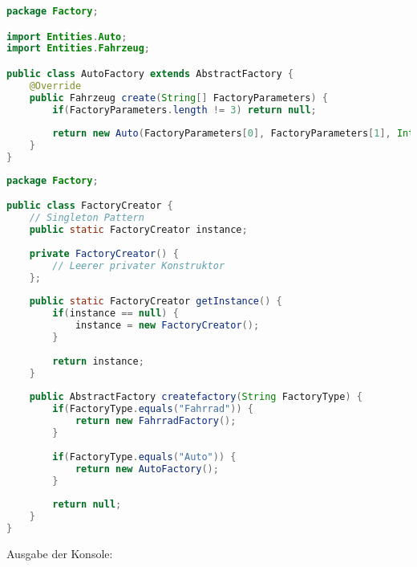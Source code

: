 \begin{lstlisting}[language=java, style=java, caption={AutoFactory.java},
label={lst:lst7}]
package Factory;

import Entities.Auto;
import Entities.Fahrzeug;

public class AutoFactory extends AbstractFactory {
	@Override
	public Fahrzeug create(String[] FactoryParameters) {
		if(FactoryParameters.length != 3) return null;
			
		return new Auto(FactoryParameters[0], FactoryParameters[1], Integer.parseInt(FactoryParameters[2]));		
	}
}
\end{lstlisting}

\begin{lstlisting}[language=java, style=java,
caption={FactoryCreator.java}, label={lst:lst8}]
package Factory;

public class FactoryCreator {
	// Singleton Pattern
	public static FactoryCreator instance;
	
	private FactoryCreator() {
		// Leerer privater Konstruktor 
	};
	
	public static FactoryCreator getInstance() {
		if(instance == null) {
			instance = new FactoryCreator();
		}
		
		return instance;
	}
	
	public AbstractFactory createfactory(String FactoryType) {
		if(FactoryType.equals("Fahrrad")) {
			return new FahrradFactory();
		}
		
		if(FactoryType.equals("Auto")) {
			return new AutoFactory();
		}
		
		return null;
	}
}
\end{lstlisting}

Ausgabe der Konsole:


\clearpage

